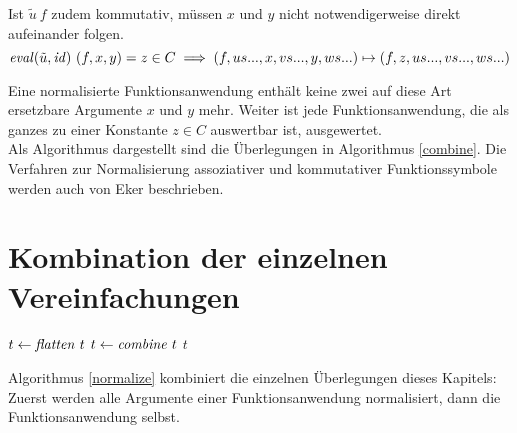 Ist $\tilde u~f$ zudem kommutativ, müssen $x$ und $y$ nicht notwendigerweise direkt aufeinander folgen.
$$\mathit{eval}(\tilde u, \mathit{id})~(f, x, y) = z \in C \implies (f, us..., x, vs..., y, ws...) \mapsto (f, z, us..., vs..., ws...)$$

Eine normalisierte Funktionsanwendung enthält keine zwei auf diese Art ersetzbare Argumente $x$ und $y$ mehr. Weiter ist jede Funktionsanwendung, die als ganzes zu einer Konstante $z \in C$ auswertbar ist, ausgewertet.\\
Als Algorithmus dargestellt sind die Überlegungen in Algorithmus \ref{combine}. Die Verfahren zur Normalisierung assoziativer und kommutativer Funktionssymbole werden auch von Eker \cite{BipartiteGraphMatching} beschrieben.

\section{Kombination der einzelnen Vereinfachungen} \label{subsecKomboNormal}

\begin{algorithm}
\DontPrintSemicolon
\caption{$\Const{normalize} \colon T \rightarrow T$}\label{normalize}

$t \leftarrow \mathit{flatten}~t$\;
$t \leftarrow \mathit{combine}~t$\;
\Return $t$ 
\end{algorithm}
Algorithmus \ref{normalize} kombiniert die einzelnen Überlegungen dieses Kapitels: Zuerst werden alle Argumente einer Funktionsanwendung normalisiert, dann die Funktionsanwendung selbst.





